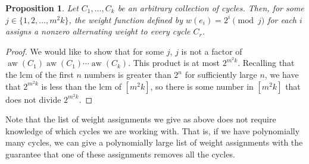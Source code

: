 \documentclass{article}
\newtheorem{proposition}[theorem]{Proposition}
\newcommand{\aw}{\operatorname{aw}}
\begin{document}
		\begin{proposition}
			Let $C_1,\ldots,C_k$ be an arbitrary collection of cycles. Then, for some $j \in \{1,2,\ldots,m^2k\}$, the weight function defined by $w(e_i) = 2^i \pmod j$ for each $i$ assigns a nonzero alternating weight to every cycle $C_r$.
		\end{proposition}
		\begin{proof}
			We would like to show that for some $j$, $j$ is not a factor of $\aw(C_1) \aw(C_1) \cdots \aw(C_k)$. This product is at most $2^{m^2k}$. Recalling that the lcm of the first $n$ numbers is greater than $2^n$ for sufficiently large $n$, we have that $2^{m^2k}$ is less than the lcm of $[m^2k]$, so there is some number in $[m^2k]$ that does not divide $2^{m^2k}$.
		\end{proof}

		Note that the list of weight assignments we give as above does not require knowledge of which cycles we are working with. That is, if we have polynomially many cycles, we can give a polynomially large list of weight assignments with the guarantee that one of these assignments removes all the cycles.

\end{document}
